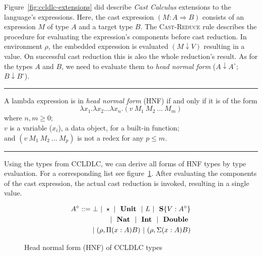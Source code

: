 Figure~\ref{fig:ccldlc-extensions} did describe \emph{Cast Calculus} extensions to the language's expressions. Here, the cast expression $(M : A \Rightarrow B)$ consists of an expression $M$ of type $A$ and a target type $B$. The \textsc{Cast-Reduce} rule describes the procedure for evaluating the expression's components before cast reduction.  In environment $\rho$, the embedded expression is evaluated $(M \downarrow V)$ resulting in a value. On successful cast reduction this is also the whole reduction's result. As for the types $A$ and $B$, we need to evaluate them to \emph{head normal form} ($A \downarrow A^\circ$; $B \downarrow B^\circ$).

\vspace{4ex}\hrule

\renewcommand{\mkcitation}[1]{\\--- #1}
\begin{displayquote}
A lambda expression is in \emph{head normal form} (HNF) if and only if it is of the form
\begin{equation*}
\lambda x_1 . \lambda x_2 \dots \lambda x_n . (v~M_1~M_2~\dots~M_m)
\end{equation*}
where $n, m \geq 0$; \\
\hspace*{11mm}$v$ is a variable ($x_i$), a data object, for a built-in function; \\
and \hspace*{2mm} $(v~M_1~M_2~\dots~M_p)$ is not a redex for any $p \leq m$.
\end{displayquote}

\hrule\vspace{4ex}

Using the types from CCLDLC, we can derive all forms of HNF types by type evaluation. For a corresponding list see figure~\ref{fig:ccldlc-hnf}. After evaluating the components of the cast expression, the actual cast reduction is invoked, resulting in a single value.

\begin{figure}
\begin{equation}
\begin{split}
 A^\circ ::= \bot ~|~ \star ~|~ \text{ \textbf{Unit} } ~|~ L ~|~ \text{ \textbf{S}}\{V:A^\circ\} \\
 |~\text{ \textbf{Nat} } ~|~ \text{ \textbf{Int} } ~|~ \text{ \textbf{Double} } \\
 |~ (\rho, \Pi(x:A)B) ~|~ (\rho, \Sigma(x:A)B)
\end{split}
\end{equation}
\caption{Head normal form (HNF) of CCLDLC types}
\label{fig:ccldlc-hnf}
\end{figure}

